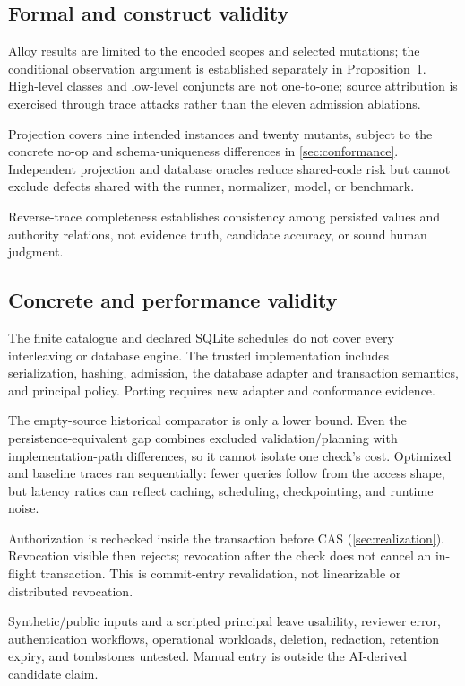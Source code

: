 \subsection{Formal and construct validity}

Alloy results are limited to the encoded scopes and selected mutations; the conditional observation argument is established separately in Proposition~1. High-level classes and low-level conjuncts are not one-to-one; source attribution is exercised through trace attacks rather than the eleven admission ablations.

Projection covers nine intended instances and twenty mutants, subject to the concrete no-op and schema-uniqueness differences in \cref{sec:conformance}. Independent projection and database oracles reduce shared-code risk but cannot exclude defects shared with the runner, normalizer, model, or benchmark.

Reverse-trace completeness establishes consistency among persisted values and authority relations, not evidence truth, candidate accuracy, or sound human judgment.

\subsection{Concrete and performance validity}

The finite catalogue and declared SQLite schedules do not cover every interleaving or database engine. The trusted implementation includes serialization, hashing, admission, the database adapter and transaction semantics, and principal policy. Porting requires new adapter and conformance evidence.

The empty-source historical comparator is only a lower bound. Even the persistence-equivalent gap combines excluded validation/planning with implementation-path differences, so it cannot isolate one check's cost. Optimized and baseline traces ran sequentially: fewer queries follow from the access shape, but latency ratios can reflect caching, scheduling, checkpointing, and runtime noise.

Authorization is rechecked inside the transaction before CAS (\cref{sec:realization}). Revocation visible then rejects; revocation after the check does not cancel an in-flight transaction. This is commit-entry revalidation, not linearizable or distributed revocation.

Synthetic/public inputs and a scripted principal leave usability, reviewer error, authentication workflows, operational workloads, deletion, redaction, retention expiry, and tombstones untested. Manual entry is outside the AI-derived candidate claim.

